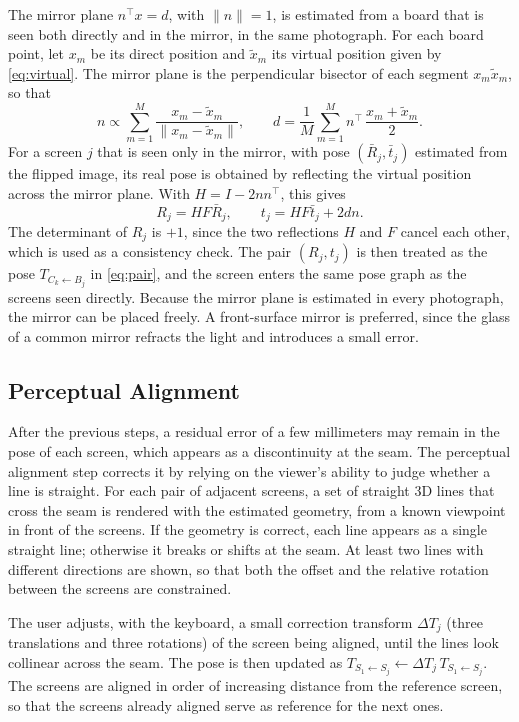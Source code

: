\documentclass[english,hidelinks]{sbrt}
\begin{document}
The mirror plane $n^\top x = d$, with $\|n\|=1$, is estimated from a board that is seen both directly and in the mirror, in the same photograph. For each board point, let $x_m$ be its direct position and $\tilde x_m$ its virtual position given by \eqref{eq:virtual}. The mirror plane is the perpendicular bisector of each segment $x_m\tilde x_m$, so that
\begin{equation}
n \propto \sum_{m=1}^{M} \frac{x_m-\tilde x_m}{\|x_m-\tilde x_m\|},\qquad d = \frac{1}{M}\sum_{m=1}^{M} n^\top\,\frac{x_m+\tilde x_m}{2}.
\label{eq:plane}
\end{equation}
For a screen $j$ that is seen only in the mirror, with pose $(\bar R_j, \bar t_j)$ estimated from the flipped image, its real pose is obtained by reflecting the virtual position across the mirror plane. With $H = I - 2nn^\top$, this gives
\begin{equation}
R_j = H F \bar R_j, \qquad t_j = H F \bar t_j + 2dn.
\label{eq:reflect}
\end{equation}
The determinant of $R_j$ is $+1$, since the two reflections $H$ and $F$ cancel each other, which is used as a consistency check. The pair $(R_j, t_j)$ is then treated as the pose $T_{C_k\leftarrow B_j}$ in \eqref{eq:pair}, and the screen enters the same pose graph as the screens seen directly. Because the mirror plane is estimated in every photograph, the mirror can be placed freely. A front-surface mirror is preferred, since the glass of a common mirror refracts the light and introduces a small error.

\subsection{Perceptual Alignment}
After the previous steps, a residual error of a few millimeters may remain in the pose of each screen, which appears as a discontinuity at the seam. The perceptual alignment step corrects it by relying on the viewer's ability to judge whether a line is straight. For each pair of adjacent screens, a set of straight 3D lines that cross the seam is rendered with the estimated geometry, from a known viewpoint in front of the screens. If the geometry is correct, each line appears as a single straight line; otherwise it breaks or shifts at the seam. At least two lines with different directions are shown, so that both the offset and the relative rotation between the screens are constrained.

The user adjusts, with the keyboard, a small correction transform $\Delta T_j$ (three translations and three rotations) of the screen being aligned, until the lines look collinear across the seam. The pose is then updated as $T_{S_1\leftarrow S_j} \leftarrow \Delta T_j\,T_{S_1\leftarrow S_j}$. The screens are aligned in order of increasing distance from the reference screen, so that the screens already aligned serve as reference for the next ones.
\end{document}
